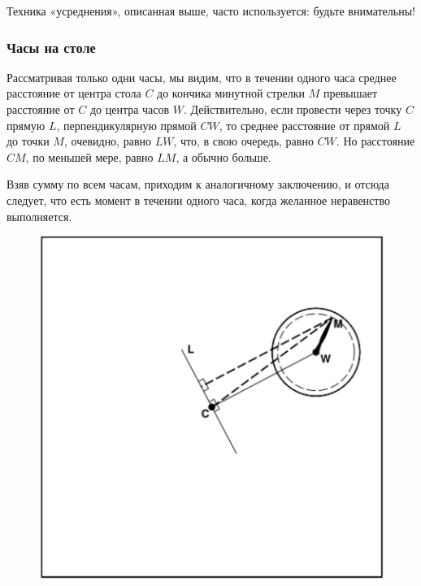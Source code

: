 
Техника «усреднения», описанная выше, часто используется: будьте внимательны!

\subsubsection*{Часы на столе} %

Рассматривая только одни часы, 
мы видим, что в течении одного часа среднее расстояние от центра стола $C$ до кончика минутной стрелки $M$ превышает расстояние от $C$ до центра часов $W$.
Действительно, если провести через точку $C$ прямую $L$, перпендикулярную прямой $CW$, 
то среднее расстояние от прямой $L$ до точки $M$, очевидно, равно $LW$, 
что, в свою очередь, равно $CW$.
Но расстояние $CM$, по меньшей мере, равно $LM$, а обычно больше.

Взяв сумму по всем часам, приходим к аналогичному заключению, и отсюда следует, что есть момент в течении одного часа, когда желанное неравенство выполняется.\heart

\begin{figure}[h!]
\centering
\includegraphics[scale=0.9]{Figs/Insight/watch}
\end{figure}

